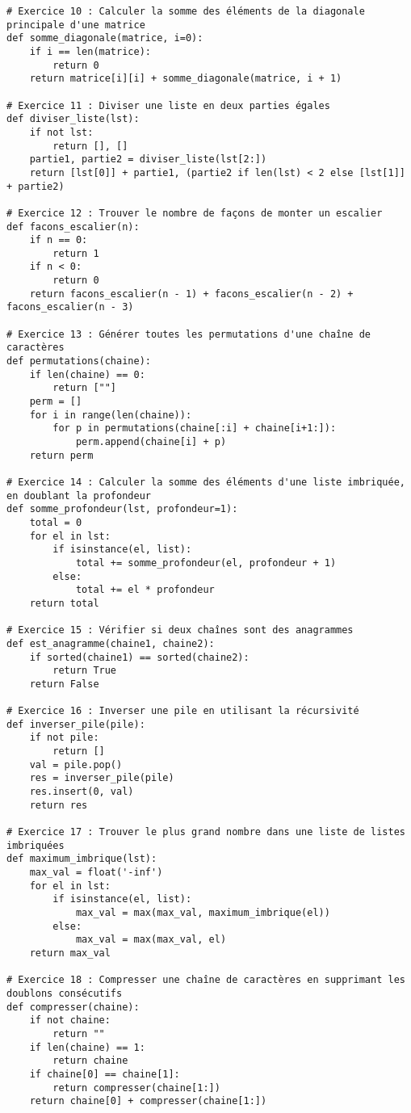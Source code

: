 \begin{lstlisting}
# Exercice 10 : Calculer la somme des éléments de la diagonale principale d'une matrice
def somme_diagonale(matrice, i=0):
    if i == len(matrice):
        return 0
    return matrice[i][i] + somme_diagonale(matrice, i + 1)

# Exercice 11 : Diviser une liste en deux parties égales
def diviser_liste(lst):
    if not lst:
        return [], []
    partie1, partie2 = diviser_liste(lst[2:])
    return [lst[0]] + partie1, (partie2 if len(lst) < 2 else [lst[1]] + partie2)

# Exercice 12 : Trouver le nombre de façons de monter un escalier
def facons_escalier(n):
    if n == 0:
        return 1
    if n < 0:
        return 0
    return facons_escalier(n - 1) + facons_escalier(n - 2) + facons_escalier(n - 3)

# Exercice 13 : Générer toutes les permutations d'une chaîne de caractères
def permutations(chaine):
    if len(chaine) == 0:
        return [""]
    perm = []
    for i in range(len(chaine)):
        for p in permutations(chaine[:i] + chaine[i+1:]):
            perm.append(chaine[i] + p)
    return perm

# Exercice 14 : Calculer la somme des éléments d'une liste imbriquée, en doublant la profondeur
def somme_profondeur(lst, profondeur=1):
    total = 0
    for el in lst:
        if isinstance(el, list):
            total += somme_profondeur(el, profondeur + 1)
        else:
            total += el * profondeur
    return total

# Exercice 15 : Vérifier si deux chaînes sont des anagrammes
def est_anagramme(chaine1, chaine2):
    if sorted(chaine1) == sorted(chaine2):
        return True
    return False

# Exercice 16 : Inverser une pile en utilisant la récursivité
def inverser_pile(pile):
    if not pile:
        return []
    val = pile.pop()
    res = inverser_pile(pile)
    res.insert(0, val)
    return res

# Exercice 17 : Trouver le plus grand nombre dans une liste de listes imbriquées
def maximum_imbrique(lst):
    max_val = float('-inf')
    for el in lst:
        if isinstance(el, list):
            max_val = max(max_val, maximum_imbrique(el))
        else:
            max_val = max(max_val, el)
    return max_val

# Exercice 18 : Compresser une chaîne de caractères en supprimant les doublons consécutifs
def compresser(chaine):
    if not chaine:
        return ""
    if len(chaine) == 1:
        return chaine
    if chaine[0] == chaine[1]:
        return compresser(chaine[1:])
    return chaine[0] + compresser(chaine[1:])


\end{lstlisting}
